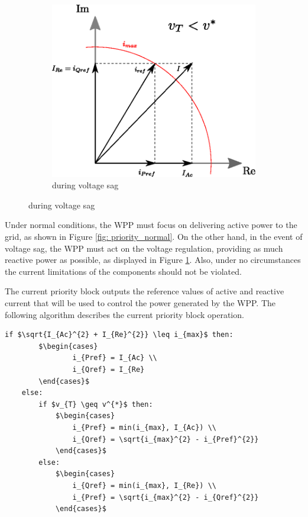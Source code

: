 \begin{figure}[b]
\begin{subfigure}[b]{0.45\textwidth}
    	\includegraphics[width=\textwidth]{Images/priority_block2.eps}
		\caption{during voltage sag}
		\label{fig: priority_sag}
	\end{subfigure}
	\label{fig: CurrentPriority}
\end{figure}

Under normal conditions, the WPP must focus on delivering active power to the grid, as shown in Figure \ref{fig: priority_normal}. On the other hand, in the event of voltage sag, the WPP must act on the voltage regulation, providing as much reactive power as possible, as displayed in Figure \ref{fig: priority_sag}. Also, under no circumstances the current limitations of the components should not be violated.

The current priority block outputs the reference values of active and reactive current that will be used to control the power generated by the WPP. The following algorithm describes the current priority block operation.

\begin{center}
	\begin{lstlisting}[mathescape, columns=fullflexible]
	if $\sqrt{I_{Ac}^{2} + I_{Re}^{2}} \leq i_{max}$ then:
		$\begin{cases}
				i_{Pref} = I_{Ac} \\
				i_{Qref} = I_{Re}
		\end{cases}$
	else:
		if $v_{T} \geq v^{*}$ then:	
			$\begin{cases}
				i_{Pref} = min(i_{max}, I_{Ac}) \\
				i_{Qref} = \sqrt{i_{max}^{2} - i_{Pref}^{2}}
			\end{cases}$
		else:
			$\begin{cases}
				i_{Qref} = min(i_{max}, I_{Re}) \\
				i_{Pref} = \sqrt{i_{max}^{2} - i_{Qref}^{2}}
			\end{cases}$
	\end{lstlisting}
\end{center}

